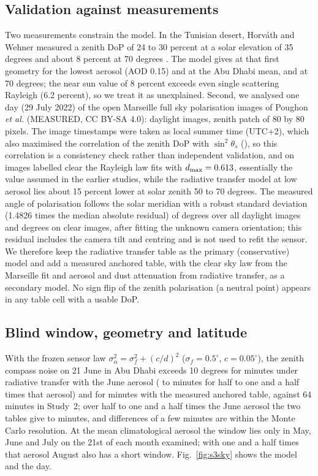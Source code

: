 \subsection{Validation against measurements}
Two measurements constrain the model. In the Tunisian desert, Horv\'ath and Wehner measured a zenith DoP of 24 to 30 percent at a solar elevation of 35 degrees and about 8 percent at 70 degrees \cite{horvath}. The model gives \sRTthirtyfiveLow{} at that first geometry for the lowest aerosol (AOD 0.15) and \sRTthirtyfiveMean{} at the Abu Dhabi mean, and \sRTseventyLow{} at 70 degrees; the near sun value of 8 percent exceeds even single scattering Rayleigh (6.2 percent), so we treat it as unexplained. Second, we analysed one day (29 July 2022) of the open Marseille full sky polarisation images of Poughon \emph{et al.} \cite{poughon24} (MEASURED, CC BY-SA 4.0): \sMeasN{} daylight images, zenith patch of 80 by 80 pixels. The image timestamps were taken as local summer time (UTC+2), which also maximised the correlation of the zenith DoP with $\sin^2\theta_s$ (\sMeasCorr{}), so this correlation is a consistency check rather than independent validation, and on images labelled clear the Rayleigh law fits with $d_{\max} = 0.613{}$, essentially the value assumed in the earlier studies, while the radiative transfer model at low aerosol lies about 15 percent lower at solar zenith 50 to 70 degrees. The measured angle of polarisation follows the solar meridian with a robust standard deviation (1.4826 times the median absolute residual) of \sMeasAopMad{} degrees over all daylight images and \sMeasAopMadClear{} degrees on clear images, after fitting the unknown camera orientation; this residual includes the camera tilt and centring and is not used to refit the sensor. We therefore keep the radiative transfer table as the primary (conservative) model and add a measured anchored table, with the clear sky law from the Marseille fit and aerosol and dust attenuation from radiative transfer, as a secondary model. No sign flip of the zenith polarisation (a neutral point) appears in any table cell with a usable DoP.

\subsection{Blind window, geometry and latitude}
With the frozen sensor law $\sigma_\alpha^2 = \sigma_f^2 + (c/d)^2$ ($\sigma_f = 0.5^\circ$, $c = 0.05^\circ$), the zenith compass noise on 21 June in Abu Dhabi exceeds 10 degrees for \sWinRT{} minutes under radiative transfer with the June aerosol (\sWinRTlo{} to \sWinRThi{} minutes for half to one and a half times that aerosol) and for \sWinAnch{} minutes with the measured anchored table, against 64 minutes in Study~2; over half to one and a half times the June aerosol the two tables give \sWinMin{} to \sWinMax{} minutes, and differences of a few minutes are within the Monte Carlo resolution. At the mean climatological aerosol the window lies only in May, June and July on the 21st of each month examined; with one and a half times that aerosol August also has a short window. Fig.~\ref{fig:s3sky} shows the model and the day.

